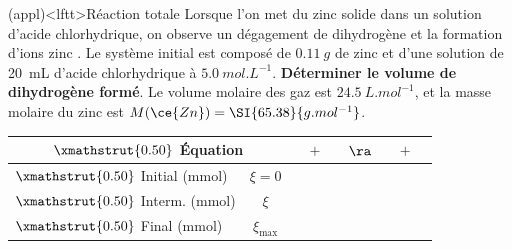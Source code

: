 \documentclass[../../main/main.tex]{subfiles}
\begin{document}
\begin{tcb}[width=\linewidth, breakable](appl)<lftt>{Réaction totale}
	Lorsque l'on met du zinc solide dans un solution d'acide chlorhydrique, on
	observe un dégagement de dihydrogène et la formation d'ions zinc
	.
	\smallbreak
	Le système initial est composé de $\SI{0.11}{g}$ de zinc et
	d'une solution de \SI{20}{mL} d'acide chlorhydrique à $\SI{5.0}{mol.L^{-1}}$.
	\smallbreak
	\textbf{Déterminer le volume de dihydrogène formé}.
	\smallbreak
	Le volume molaire des gaz est $\SI{24.5}{L.mol^{-1}}$, et la masse molaire du
	zinc est $M(\ce{Zn}) = \SI{65.38}{g.mol^{-1}}$.
	\tcblower
	\begin{center}
		\def\rhgt{0.50}
		\centering
		\begin{tabularx}{\linewidth}{|l|c|YdYdYdY|}
			\hline
			\multicolumn{2}{|c|}{
				$\xmathstrut{\rhgt}$
			\textbf{Équation}}          &
			      & $+$          &
			    & $\ra$        &
			 & $+$          &
			                       \\
			\hline
			$\xmathstrut{\rhgt}$
			Initial (\si{mmol})         & $\xi = 0$    &
			          & \vline       &
			           & \vline       &
			             & \vline       &
			                              \\
			\hline
			$\xmathstrut{\rhgt}$
			Interm. (\si{mmol})         & $\xi$        &
			     & \vline       &
			     & \vline       &
			\psw{$\xi$}                 & \vline       &
			\psw{$\xi$}                                  \\
			\hline
			$\xmathstrut{\rhgt}$
			Final (\si{mmol})           & $\xi_{\max}$ &
			             & \vline       &
			         & \vline       &
			          & \vline       &
			                           \\
			\hline
		\end{tabularx}
	\end{center}
\end{tcb}
\end{document}
